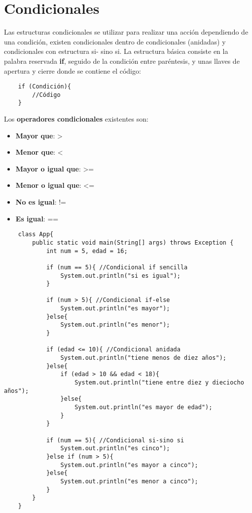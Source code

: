 \section{Condicionales}
\hspace{0.55cm}Las estructuras condicionales se utilizar para realizar una acción dependiendo de una condición, existen condicionales dentro de condicionales (anidadas) y condicionales con estructura si- sino si. La estructura básica consiste en la palabra reservada \textbf{if}, seguido de la condición entre paréntesis, y unas llaves de apertura y cierre donde se contiene el código:
\begin{lstlisting}
    if (Condición){
        //Código
    }
\end{lstlisting}

Los \textbf{operadores condicionales} existentes son:
\begin{itemize}
    \item \textbf{Mayor que}: >
    \item \textbf{Menor que}: <
    \item \textbf{Mayor o igual que}: >=
    \item \textbf{Menor o igual que}: <=
    \item \textbf{No es igual}: !=
    \item \textbf{Es igual}: ==
\end{itemize}
\begin{lstlisting}
    class App{
        public static void main(String[] args) throws Exception {
            int num = 5, edad = 16;
            
            if (num == 5){ //Condicional if sencilla
                System.out.println("si es igual");
            }
            
            if (num > 5){ //Condicional if-else
                System.out.println("es mayor");
            }else{
                System.out.println("es menor");
            }
            
            if (edad <= 10){ //Condicional anidada
                System.out.println("tiene menos de diez años");
            }else{
                if (edad > 10 && edad < 18){
                    System.out.println("tiene entre diez y dieciocho años");
                }else{
                    System.out.println("es mayor de edad");
                }
            }
            
            if (num == 5){ //Condicional si-sino si
                System.out.println("es cinco");
            }else if (num > 5){
                System.out.println("es mayor a cinco");
            }else{
                System.out.println("es menor a cinco");
            }
        }
    }
\end{lstlisting}



